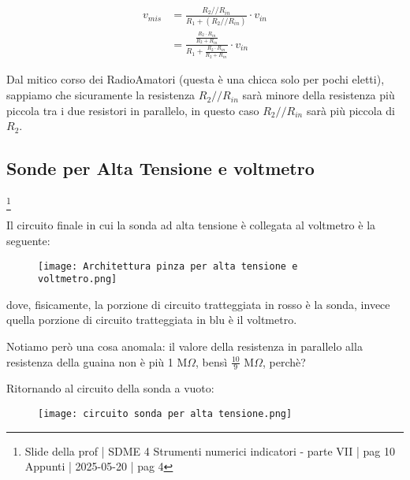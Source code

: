 {
    \Large
    \begin{equation}
        \begin{split}
            v_{mis}
            &= 
            \frac{R_2 // R_{in}}{R_1 + (R_2 // R_{in})} \cdot v_{in}
            \\
            &= 
            \frac{\frac{R_2 \cdot R_{in}}{R_2 + R_{in}}}{R_1 + \frac{R_2 \cdot R_{in}}{R_2 + R_{in}}} \cdot v_{in}
        \end{split}
    \end{equation}
}

Dal mitico corso dei RadioAmatori (questa è una chicca solo per pochi eletti), 
sappiamo che sicuramente la resistenza $R_2 // R_{in}$ sarà minore della resistenza più piccola tra i due resistori in parallelo, 
in questo caso $R_2 // R_{in}$ sarà più piccola di $R_2$. \newline 

\newpage 

\subsection{Sonde per Alta Tensione e voltmetro}
\footnote{Slide della prof | SDME 4 Strumenti numerici indicatori - parte VII | pag 10\\  
Appunti | 2025-05-20 | pag 4 }

Il circuito finale in cui la sonda ad alta tensione è collegata al voltmetro è la seguente: 

\begin{figure}[h]
    \centering
    \texttt{[image: Architettura pinza per alta tensione e voltmetro.png]}
\end{figure}

dove, fisicamente, la porzione di circuito tratteggiata in rosso è la sonda, 
invece quella porzione di circuito tratteggiata in blu è il voltmetro. \newline 

Notiamo però una cosa anomala: il valore della resistenza in parallelo alla resistenza della guaina non è più 1 M$\Omega$, bensì $\frac{10}{9}$ M$\Omega$, perchè? \newline 

Ritornando al circuito della sonda a vuoto: 

\begin{figure}[h]
    \centering
    \texttt{[image: circuito sonda per alta tensione.png]}
\end{figure}

